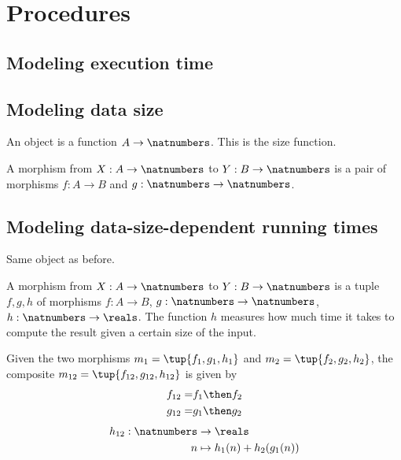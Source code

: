 

\section{Procedures}



\subsection{Modeling execution time}


\subsection{Modeling data size}

An object is a function $A \to \natnumbers $. This is the size function.


A morphism from $X: A \to \natnumbers $ to $Y: B \to \natnumbers$ is a pair of morphisms
$f: A \to B$ and $g: \natnumbers \to \natnumbers$.


\subsection{Modeling data-size-dependent running times}

Same object as before.


A morphism from $X: A \to \natnumbers $ to $Y: B \to \natnumbers$ is a tuple $f, g, h$ of morphisms
$f: A \to B$, $g: \natnumbers \to \natnumbers$, $h: \natnumbers \to \reals$. The function $h$ measures
how much time it takes to compute the result given a certain size of the input.

Given the two morphisms $m_1 = \tup{f_1, g_1, h_1}$ and $m_2 = \tup{f_2, g_2, h_2}$, the composite
$m_{12} = \tup{f_{12}, g_{12}, h_{12}}$ is given by
%
\begin{eqnarray}
  f_{12} =& f_1 \then f_2 \\
  g_{12} =& g_1 \then g_2 \\
\end{eqnarray}
%
\begin{eqnarray}
  h_{12} : \natnumbers & \to \reals \\
  n & \mapsto h_1(n) + h_2( g_1 (n))
\end{eqnarray}
